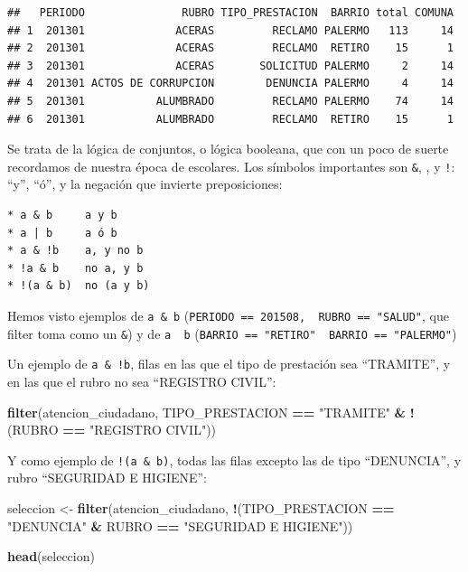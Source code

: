 \documentclass[spanish,]{book}
\newenvironment{Shaded}{\begin{snugshade}}{\end{snugshade}}
\newcommand{\KeywordTok}[1]{\textcolor[rgb]{0.13,0.29,0.53}{\textbf{#1}}}
\newcommand{\NormalTok}[1]{#1}
\newcommand{\OperatorTok}[1]{\textcolor[rgb]{0.81,0.36,0.00}{\textbf{#1}}}
\newcommand{\StringTok}[1]{\textcolor[rgb]{0.31,0.60,0.02}{#1}}
\begin{document}
\begin{verbatim}
##   PERIODO               RUBRO TIPO_PRESTACION  BARRIO total COMUNA
## 1  201301              ACERAS         RECLAMO PALERMO   113     14
## 2  201301              ACERAS         RECLAMO  RETIRO    15      1
## 3  201301              ACERAS       SOLICITUD PALERMO     2     14
## 4  201301 ACTOS DE CORRUPCION        DENUNCIA PALERMO     4     14
## 5  201301           ALUMBRADO         RECLAMO PALERMO    74     14
## 6  201301           ALUMBRADO         RECLAMO  RETIRO    15      1
\end{verbatim}

Se trata de la lógica de conjuntos, o lógica booleana, que con un poco de suerte recordamos de nuestra época de escolares. Los símbolos importantes son \texttt{\&}, \texttt{\textbar{}}, y \texttt{!}: ``y'', ``ó'', y la negación que invierte preposiciones:

\begin{verbatim}
* a & b     a y b
* a | b     a ó b
* a & !b    a, y no b
* !a & b    no a, y b
* !(a & b)  no (a y b) 
\end{verbatim}

Hemos visto ejemplos de \texttt{a\ \&\ b} (\texttt{PERIODO\ ==\ 201508,\ \ RUBRO\ ==\ "SALUD"}, que filter toma como un \texttt{\&}) y de \texttt{a\ \textbar{}\ b} (\texttt{BARRIO\ ==\ "RETIRO"\ \textbar{}\ BARRIO\ ==\ "PALERMO"})

Un ejemplo de \texttt{a\ \&\ !b}, filas en las que el tipo de prestación sea ``TRAMITE'', y en las que el rubro no sea ``REGISTRO CIVIL'':

\begin{Shaded}
\begin{Highlighting}[]
\KeywordTok{filter}\NormalTok{(atencion_ciudadano, TIPO_PRESTACION }\OperatorTok{==}\StringTok{ "TRAMITE"} \OperatorTok{&}\StringTok{ }\OperatorTok{!}\NormalTok{(RUBRO }\OperatorTok{==}\StringTok{ "REGISTRO CIVIL"}\NormalTok{))}
\end{Highlighting}
\end{Shaded}

Y como ejemplo de \texttt{!(a\ \&\ b)}, todas las filas excepto las de tipo ``DENUNCIA'', y rubro ``SEGURIDAD E HIGIENE'':

\begin{Shaded}
\begin{Highlighting}[]
\NormalTok{seleccion <-}\StringTok{ }\KeywordTok{filter}\NormalTok{(atencion_ciudadano, }\OperatorTok{!}\NormalTok{(TIPO_PRESTACION }\OperatorTok{==}\StringTok{ "DENUNCIA"} \OperatorTok{&}\StringTok{ }\NormalTok{RUBRO }\OperatorTok{==}\StringTok{ "SEGURIDAD E HIGIENE"}\NormalTok{))}

\KeywordTok{head}\NormalTok{(seleccion)}
\end{Highlighting}
\end{Shaded}
\end{document}
